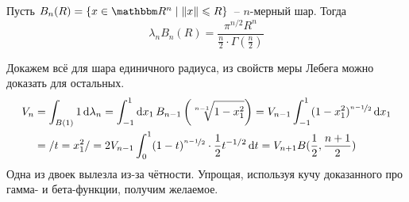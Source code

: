 \documentclass[draft, timbord]{longnotes}
\begin{document}
\begin{thrm}\label{thrm:meas::ball}
  Пусть $B_n(R) = \{x \in \R^n \mid \|x\| \leqslant R \}$~-- $n$-мерный шар.
  Тогда 
  \[
    \lambda_n B_n(R) = \frac{\pi ^{n/2} R^n}{\tfrac{n}{2} \cdot \Gamma(\tfrac{n}{2})} 
  \]
\end{thrm}
\begin{tproof}
  Докажем всё для шара единичного радиуса, из свойств меры Лебега можно доказать для
  остальных.
  \[
    \begin{split}
      V_n 
      &= \int_{B(1)} 1 \, \mathrm{d} \lambda_n 
      = \int_{-1}^1 \mathrm{d} x_1 \, B_{n-1}\left(\sqrt[n-1]{1-x_1^2}\right)
      = V_{n-1} \int_{-1}^1 (1-x_1^2) ^{\nicefrac{n-1}{2}} \, \mathrm{d} x_1 \\
      &= /t=x_1^2/ = 2 V_{n-1} \int _0^1 (1-t)^{\nicefrac{n-1}{2}} \cdot \frac{1}{2} t^{-1/2} \, \mathrm{d} t
      = V_{n+1} B(\frac 1 2, \frac {n+1} 2)
    \end{split}
  \]
  Одна из двоек вылезла из-за чётности. Упрощая, используя кучу доказанного про гамма- и
  бета-функции, получим желаемое.
\end{tproof}
\end{document}

